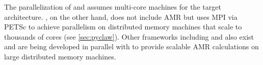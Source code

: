 The parallelization of \amrclaw and \geoclaw assumes multi-core machines for the target architecture.  \pyclaw, on the other hand, does not include AMR but uses MPI via
PETSc to achieve parallelism on distributed memory machines that scale to
thousands of cores (see \cref{sec:pyclaw}).
Other frameworks including
\forestclaw \cite{Burstedde:we} and \boxlib {} also
exist and are being developed in parallel with \amrclaw to provide scalable
AMR calculations on large distributed memory machines.

